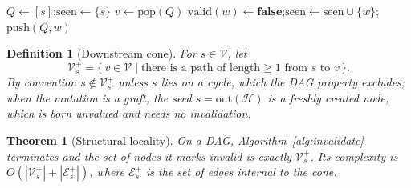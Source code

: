 \documentclass[11pt,a4paper]{article}
\newtheorem{theorem}{Theorem}
\newtheorem{definition}{Definition}
\newcommand{\G}{\mathcal{G}}
\newcommand{\Hb}{\mathcal{H}}
\newcommand{\V}{\mathcal{V}}
\newcommand{\E}{\mathcal{E}}
\begin{document}
\begin{algorithm}
\caption{\textsc{Invalidate}$(\G, s)$ --- reactive invalidation from a seed node $s$}
\label{alg:invalidate}
\begin{algorithmic}[1]
\State $Q \gets [s]$;\quad $\mathrm{seen} \gets \{s\}$
    \State $v \gets \mathrm{pop}(Q)$
    \For{each $w$ with $(v, w) \in \E$}
            \State $\mathrm{valid}(w) \gets \mathbf{false}$;\quad $\mathrm{seen} \gets \mathrm{seen} \cup \{w\}$;\quad $\mathrm{push}(Q, w)$
        \EndIf
    \EndFor
\EndWhile
\end{algorithmic}
\end{algorithm}

\begin{definition}[Downstream cone]
For $s \in \V$, let
\[
\V_s^{+} = \{\, v \in \V \mid \text{there is a path of length} \geq 1 \text{ from } s \text{ to } v \,\}.
\]
By convention $s \notin \V_s^{+}$ unless $s$ lies on a cycle, which the DAG property excludes; when the mutation is a graft, the seed $s = \mathrm{out}(\Hb)$ is a freshly created node, which is born unvalued and needs no invalidation.
\end{definition}

\begin{theorem}[Structural locality]
\label{thm:locality}
On a DAG, Algorithm~\ref{alg:invalidate} terminates and the set of nodes it marks invalid is exactly $\V_s^{+}$. Its complexity is $O(|\V_s^{+}| + |\E_s^{+}|)$, where $\E_s^{+}$ is the set of edges internal to the cone.
\end{theorem}
\end{document}
